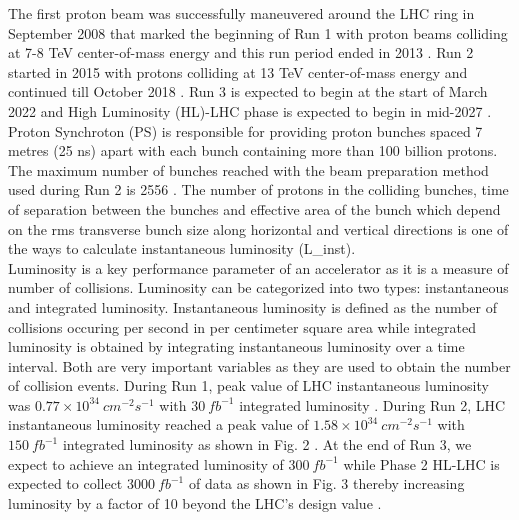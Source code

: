 The first proton beam was successfully maneuvered around the LHC ring in September 2008 that marked the beginning of Run 1 with proton beams colliding at 7-8 TeV center-of-mass energy and this run period ended in 2013 \cite{cmsrun}. Run 2 started in 2015 with protons colliding at 13 TeV center-of-mass energy and continued till October 2018 \cite{Wenninger:2668326}. Run 3 is expected to begin at the start of March 2022 and High Luminosity (HL)-LHC phase is expected to begin in mid-2027 \cite{Dainese:2019rgk}. Proton Synchroton (PS) is responsible for providing proton bunches spaced 7 metres (25 ns) apart with each bunch containing more than 100 billion protons. The maximum number of bunches reached with the beam preparation method used during Run 2 is 2556 \cite{Wenninger:2668326}. The number of protons in the colliding bunches, time of separation between the bunches and effective area of the bunch which depend on the rms transverse bunch size along horizontal and vertical directions is one of the ways to calculate instantaneous luminosity (L_{inst}). \\

Luminosity is a key performance parameter of an accelerator as it is a measure of number of collisions. Luminosity can be categorized into two types: instantaneous and integrated luminosity. Instantaneous luminosity is defined as the number of collisions occuring per second in per centimeter square area while integrated luminosity is obtained by integrating instantaneous luminosity over a time interval. Both are very important variables as they are used to obtain the number of collision events. During Run 1, peak value of LHC instantaneous luminosity was $0.77 \times 10^{34} \: cm^{-2} s^{-1} $ with $30 \: fb^{-1}$ integrated luminosity \cite{cmsrun1lumi}  . During Run 2, LHC instantaneous luminosity reached a peak value of $1.58 \times 10^{34}  \: cm^{-2} s^{-1}$ with $150 \: fb^{-1}$ integrated luminosity as shown in Fig. 2 \cite{CMS:2018elu}. At the end of Run 3, we expect to achieve an integrated luminosity  of $300 \:fb^{-1}$ while Phase 2 HL-LHC is expected to collect $3000 \:fb^{-1}$ of data as shown in Fig. 3 thereby increasing luminosity by a factor of 10 beyond the LHC's design value \cite{Dainese:2019rgk}. \\


